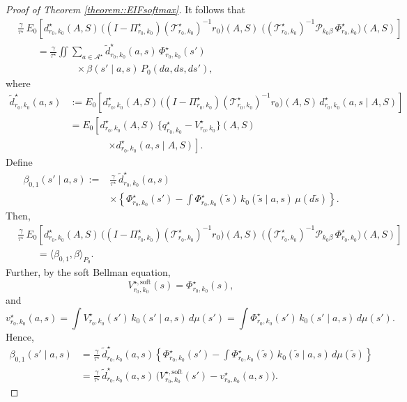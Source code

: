 \documentclass[11pt]{article}
\theoremstyle{plain}
\begin{document}
\begin{proof}[Proof of Theorem \ref{theorem::EIFsoftmax}]
It follows that
\[
\begin{aligned}
&\tfrac{\gamma}{\tau^\star}\,
E_0\!\left[d_{r_0,k_0}^{\star}(A,S)\,
\big((I-\Pi_{r_0,k_0}^\star)(\mathcal{T}_{r_0,k_0}^\star)^{-1} r_0\big)(A,S)\;
\big((\mathcal{T}_{r_0,k_0}^\star)^{-1}\mathcal{P}_{k_0\beta}\,\Phi_{r_0,k_0}^\star\big)(A,S)
\right] \\
&\qquad= \tfrac{\gamma}{\tau^\star}
\iint \sum_{a\in\mathcal{A}^\star} \widetilde{d}_{r_0,k_0}^\star(a,s)\,
\Phi_{r_0,k_0}^\star(s') \\
&\qquad\qquad\qquad \times
\beta(s'\mid a,s)\,P_0(da,ds,ds'),
\end{aligned}
\]
where
\[
\begin{aligned}
\widetilde{d}_{r_0,k_0}^\star(a,s)
&:= E_0\!\left[d_{r_0,k_0}^{\star}(A,S)\,
\big((I-\Pi_{r_0,k_0}^\star)(\mathcal{T}_{r_0,k_0}^\star)^{-1} r_0\big)(A,S)\,
d_{r_0,k_0}^{\star}(a,s\mid A,S)\right] \\
&= E_0\!\left[d_{r_0,k_0}^{\star}(A,S)\,
\{q_{r_0,k_0}^\star - V_{r_0,k_0}^\star\}(A,S)\right. \\
&\qquad\qquad \left.
\times d_{r_0,k_0}^{\star}(a,s\mid A,S)\right].
\end{aligned}
\]
Define 
\[
\begin{aligned}
\beta_{0,1}(s' \mid a, s)
:={}& \tfrac{\gamma}{\tau^\star}\,\widetilde{d}_{r_0,k_0}^\star(a,s) \\
&\times \left\{\Phi_{r_0,k_0}^\star(s')
- \int \Phi_{r_0,k_0}^\star(\tilde s)\,k_0(\tilde s \mid a, s)\,\mu(d\tilde s)\right\}.
\end{aligned}
\]
Then,
\[
\begin{aligned}
&\tfrac{\gamma}{\tau^\star}\,
E_0\!\left[d_{r_0,k_0}^{\star}(A,S)\,
\big((I-\Pi_{r_0,k_0}^\star)(\mathcal{T}_{r_0,k_0}^\star)^{-1} r_0\big)(A,S)\;
\big((\mathcal{T}_{r_0,k_0}^\star)^{-1}\mathcal{P}_{k_0\beta}\,\Phi_{r_0,k_0}^\star\big)(A,S)
\right] \\
&\qquad=  \langle \beta_{0,1}, \beta \rangle_{P_0}.
\end{aligned}
\]
Further, by the soft Bellman equation,
\[
V_{r_0,k_0}^{\star,\mathrm{soft}}(s)=\Phi_{r_0,k_0}^\star(s),
\]
and
\[
v_{r_0,k_0}^\star(a,s)
=\int V_{r_0,k_0}^\star(s')\,k_0(s'\mid a,s)\,d\mu(s')
=\int \Phi_{r_0,k_0}^\star(s')\,k_0(s'\mid a,s)\,d\mu(s').
\]
Hence,
\[
\begin{aligned}
\beta_{0,1}(s'\mid a,s)
&=\frac{\gamma}{\tau^\star}\,\widetilde{d}_{r_0,k_0}^\star(a,s)\left\{
\Phi_{r_0,k_0}^\star(s')
-\int \Phi_{r_0,k_0}^\star(\tilde s)\,k_0(\tilde s\mid a,s)\,d\mu(\tilde s)
\right\}\\
&=\frac{\gamma}{\tau^\star}\,\widetilde{d}_{r_0,k_0}^\star(a,s)\,
\Big(V_{r_0,k_0}^{\star,\mathrm{soft}}(s')-v_{r_0,k_0}^\star(a,s)\Big).
\end{aligned}
\]
 





\end{proof}
\end{document}
